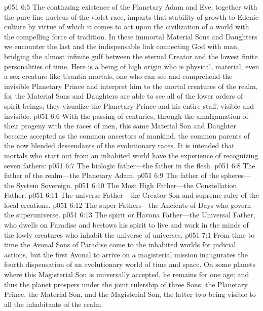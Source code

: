 \pc \vs p051 6:5 The continuing existence of the Planetary Adam and Eve, together with the pure\hyp{}line nucleus of the violet race, imparts that stability of growth to Edenic culture by virtue of which it comes to act upon the civilization of a world with the compelling force of tradition. In these immortal Material Sons and Daughters we encounter the last and the indispensable link connecting God with man, bridging the almost infinite gulf between the eternal Creator and the lowest finite personalities of time. Here is a being of high origin who is physical, material, even a sex creature like Urantia mortals, one who can see and comprehend the invisible Planetary Prince and interpret him to the mortal creatures of the realm, for the Material Sons and Daughters are able to see all of the lower orders of spirit beings; they visualize the Planetary Prince and his entire staff, visible and invisible.
\vs p051 6:6 With the passing of centuries, through the amalgamation of their progeny with the races of men, this same Material Son and Daughter become accepted as the common ancestors of mankind, the common parents of the now blended descendants of the evolutionary races. It is intended that mortals who start out from an inhabited world have the experience of recognizing seven fathers:
\pc \vs p051 6:7 \bibnobreakspace The biologic father---the father in the flesh.
\vs p051 6:8 \bibnobreakspace The father of the realm---the Planetary Adam.
\vs p051 6:9 \bibnobreakspace The father of the spheres---the System Sovereign.
\vs p051 6:10 \bibnobreakspace The Most High Father---the Constellation Father.
\vs p051 6:11 \bibnobreakspace The universe Father---the Creator Son and supreme ruler of the local creations.
\vs p051 6:12 \bibnobreakspace The super\hyp{}Fathers---the Ancients of Days who govern the superuniverse.
\vs p051 6:13 \bibnobreakspace The spirit or Havona Father---the Universal Father, who dwells on Paradise and bestows his spirit to live and work in the minds of the lowly creatures who inhabit the universe of universes.
\vs p051 7:1 From time to time the Avonal Sons of Paradise come to the inhabited worlds for judicial actions, but the first Avonal to arrive on a magisterial mission inaugurates the fourth dispensation of an evolutionary world of time and space. On some planets where this Magisterial Son is universally accepted, he remains for one age; and thus the planet prospers under the joint rulership of three Sons: the Planetary Prince, the Material Son, and the Magisterial Son, the latter two being visible to all the inhabitants of the realm.
